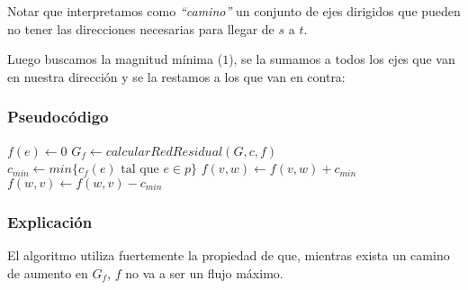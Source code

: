 \begin{figure}[htb]
    \centering
    
\end{figure}

Notar que interpretamos como \emph{``camino''} un conjunto de ejes dirigidos que pueden no tener las direcciones necesarias para llegar de $s$ a $t$. 

Luego buscamos la magnitud m\'inima ($1$), se la sumamos a todos los ejes que van en nuestra direcci\'on y se la restamos a los que van en contra:


\begin{figure}[htb]
    \centering
    
\end{figure}

\newpage
\subsubsection*{Pseudoc\'odigo}
\begin{algorithm}
\begin{algorithmic}[1]
    \State $f(e) \gets 0$
  \EndFor
  \State $G_f \gets calcularRedResidual(G, c, f)$
    \State $c_{min} \gets min\{c_f(e) \textrm{ tal que } e \in p\}$
        \State $f(v,w) \gets f(v,w) + c_{min}$
        \State $f(w,v) \gets f(w,v) - c_{min}$ 
    \EndFor
  \EndWhile
\EndFunction
\end{algorithmic}
\end{algorithm}

\subsubsection*{Explicaci\'on}

El algoritmo utiliza fuertemente la propiedad de que, mientras exista un camino de aumento en $G_f$, $f$ no va a ser un flujo m\'aximo. 


